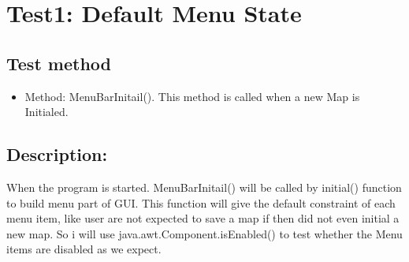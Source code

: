 \documentclass[11pt, a4paper]{report}
\begin{document}
\section{Test1: Default Menu State}
\subsection{Test method}
\begin{itemize}
\item Method: MenuBarInitail(). This method is called when a new Map is Initialed.
\end{itemize}
\subsection{Description:}
When the program is started. MenuBarInitail() will be called by initial() function to build menu part of GUI. This function will give the default constraint of each menu item, like user are not expected to save a map if then did not even initial a new map. So i will use java.awt.Component.isEnabled() to test whether the Menu items are disabled as we expect.
\end{document}
